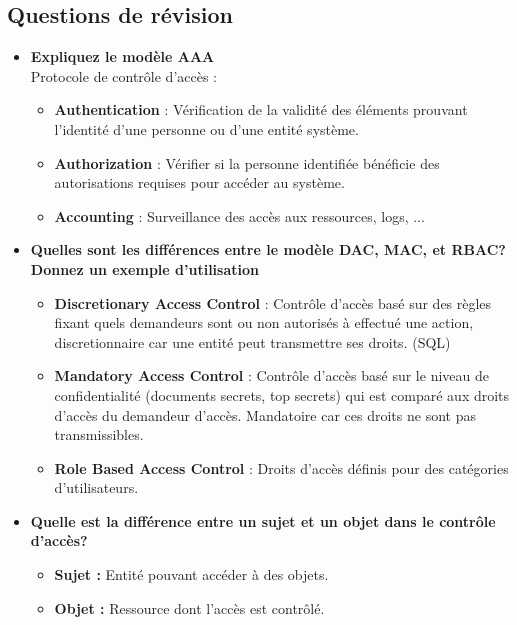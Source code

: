 \documentclass{report}
\begin{document}
		\subsection{Questions de révision}
			\begin{itemize}
				\item \textbf{Expliquez le modèle AAA}\\

					Protocole de contrôle d'accès : \\

					\begin{itemize}
						\item \textbf{Authentication} : Vérification de la validité des éléments prouvant l'identité d'une personne ou d'une entité système.
						\item \textbf{Authorization} : Vérifier si la personne identifiée bénéficie des autorisations requises pour accéder au système.
						\item \textbf{Accounting} : Surveillance des accès aux ressources, logs, ...\\
					\end{itemize}

				\item \textbf{Quelles sont les différences entre le modèle DAC, MAC, et RBAC? Donnez un exemple d'utilisation}\\

					\begin{itemize}
						\item \textbf{Discretionary Access Control} : Contrôle d'accès basé sur des règles fixant quels demandeurs sont ou non autorisés à effectué une action, discretionnaire car une entité peut transmettre ses droits. (SQL)
						\item \textbf{Mandatory Access Control} : Contrôle d'accès basé sur le niveau de confidentialité (documents secrets, top secrets) qui est comparé aux droits d'accès du demandeur d'accès. Mandatoire car ces droits ne sont pas transmissibles.
						\item \textbf{Role Based Access Control} : Droits d'accès définis pour des catégories d'utilisateurs.\\
					\end{itemize}

				\item \textbf{Quelle est la différence entre un sujet et un objet dans le contrôle d'accès?}\\

					\begin{itemize}
						\item \textbf{Sujet : } Entité pouvant accéder à des objets.
						\item \textbf{Objet : } Ressource dont l'accès est contrôlé.
					\end{itemize}


\end{itemize}
\end{document}
